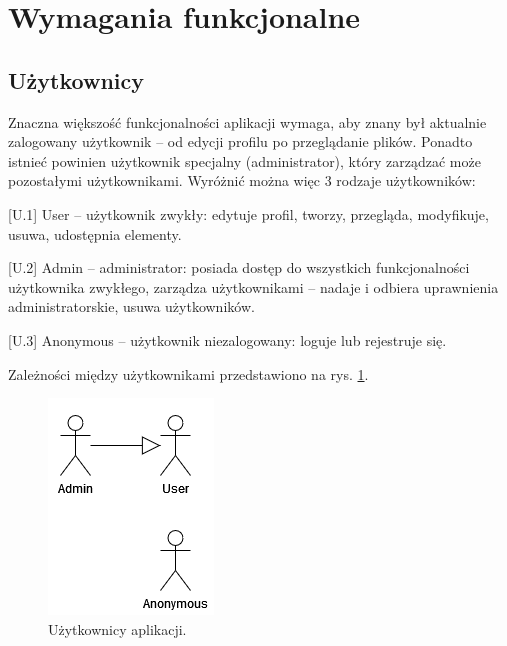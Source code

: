 \documentclass[a4paper,twoside,12pt]{book}
\begin{document}
\section{Wymagania funkcjonalne}

\subsection{Użytkownicy}
Znaczna większość funkcjonalności aplikacji wymaga, aby znany był aktualnie zalogowany użytkownik -- od edycji profilu po przeglądanie plików. Ponadto istnieć powinien użytkownik specjalny (administrator), który zarządzać może pozostałymi użytkownikami. Wyróżnić można więc 3 rodzaje użytkowników:
\begin{description}
	\item \label{user1} [U.1] User -- użytkownik zwykły: edytuje profil, tworzy, przegląda, modyfikuje, usuwa, udostępnia elementy.
	\item \label{user2} [U.2] Admin -- administrator: posiada dostęp do wszystkich funkcjonalności użytkownika zwykłego, zarządza użytkownikami -- nadaje i odbiera uprawnienia administratorskie, usuwa użytkowników.
	\item \label{user3} [U.3] Anonymous -- użytkownik niezalogowany: loguje lub rejestruje się.
\end{description}	

Zależności między użytkownikami przedstawiono na rys. \ref{fig:uml-users}.

\begin{figure}
\centering
\includegraphics{./UML-Users.png}
\caption{Użytkownicy aplikacji.}
\label{fig:uml-users}
\end{figure}
\end{document}

